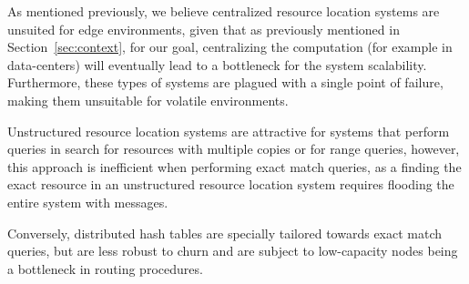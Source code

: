As mentioned previously, we believe centralized resource location systems are unsuited for edge environments, given that as previously mentioned in Section~\ref{sec:context}, for our goal, centralizing the computation (for example in data-centers) will eventually lead to a bottleneck for the system scalability. Furthermore, these types of systems are plagued with a single point of failure, making them unsuitable for volatile environments.

Unstructured resource location systems are attractive for systems that perform queries in search for resources with multiple copies or for range queries, however, this approach is inefficient when performing exact match queries, as a finding the exact resource in an unstructured resource location system requires flooding the entire system with messages.

Conversely, distributed hash tables are specially tailored towards exact match queries, but are less robust to churn and are subject to low-capacity nodes being a bottleneck in routing procedures. 










